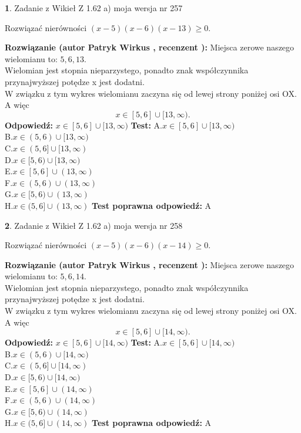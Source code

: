 \documentclass[12pt, a4paper]{article}
\theoremstyle{definition} %
\newtheorem{zad}{}
\newcommand{\zadStart}[1]{\begin{zad}#1\newline}
\newcommand{\zadStop}{\end{zad}}
\newcommand{\rozwStart}[2]{\noindent \textbf{Rozwiązanie (autor #1 , recenzent #2): }\newline}
\newcommand{\rozwStop}{\newline}
\newcommand{\odpStart}{\noindent \textbf{Odpowiedź:}\newline}
\newcommand{\odpStop}{\newline}
\newcommand{\testStart}{\noindent \textbf{Test:}\newline}
\newcommand{\testStop}{\newline}
\newcommand{\kluczStart}{\noindent \textbf{Test poprawna odpowiedź:}\newline}
\newcommand{\kluczStop}{\newline}
\begin{document}
\zadStart{Zadanie z Wikieł Z 1.62 a) moja wersja nr 257}

Rozwiązać nierówności $(x-5)(x-6)(x-13)\ge0$.
\zadStop
\rozwStart{Patryk Wirkus}{}
Miejsca zerowe naszego wielomianu to: $5, 6, 13$.\\
Wielomian jest stopnia nieparzystego, ponadto znak współczynnika przy\linebreak najwyższej potędze x jest dodatni.\\ W związku z tym wykres wielomianu zaczyna się od lewej strony poniżej osi OX. A więc $$x \in [5,6] \cup [13,\infty).$$
\rozwStop
\odpStart
$x \in [5,6] \cup [13,\infty)$
\odpStop
\testStart
A.$x \in [5,6] \cup [13,\infty)$\\
B.$x \in (5,6) \cup [13,\infty)$\\
C.$x \in (5,6] \cup [13,\infty)$\\
D.$x \in [5,6) \cup [13,\infty)$\\
E.$x \in [5,6] \cup (13,\infty)$\\
F.$x \in (5,6) \cup (13,\infty)$\\
G.$x \in [5,6) \cup (13,\infty)$\\
H.$x \in (5,6] \cup (13,\infty)$
\testStop
\kluczStart
A
\kluczStop



\zadStart{Zadanie z Wikieł Z 1.62 a) moja wersja nr 258}

Rozwiązać nierówności $(x-5)(x-6)(x-14)\ge0$.
\zadStop
\rozwStart{Patryk Wirkus}{}
Miejsca zerowe naszego wielomianu to: $5, 6, 14$.\\
Wielomian jest stopnia nieparzystego, ponadto znak współczynnika przy\linebreak najwyższej potędze x jest dodatni.\\ W związku z tym wykres wielomianu zaczyna się od lewej strony poniżej osi OX. A więc $$x \in [5,6] \cup [14,\infty).$$
\rozwStop
\odpStart
$x \in [5,6] \cup [14,\infty)$
\odpStop
\testStart
A.$x \in [5,6] \cup [14,\infty)$\\
B.$x \in (5,6) \cup [14,\infty)$\\
C.$x \in (5,6] \cup [14,\infty)$\\
D.$x \in [5,6) \cup [14,\infty)$\\
E.$x \in [5,6] \cup (14,\infty)$\\
F.$x \in (5,6) \cup (14,\infty)$\\
G.$x \in [5,6) \cup (14,\infty)$\\
H.$x \in (5,6] \cup (14,\infty)$
\testStop
\kluczStart
A
\kluczStop
\end{document}
